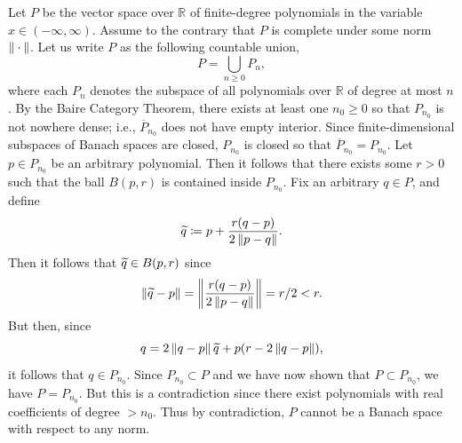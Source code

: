 \documentclass{article}
\begin{document}
	Let $P$ be the vector space over $\mathbb{R}$ of finite-degree polynomials in the variable $x\in (-\infty, \infty)$. Assume to the contrary that $P$ is complete under some norm $\left\Vert \hspace{2pt}\cdot\hspace{2pt} \right\Vert$. Let us write $P$ as the following countable union, 
	\begin{equation*}
		P = \bigcup_{n \geq 0} P_{n}, 
	\end{equation*}
	where each $P_n$ denotes the subspace of all polynomials over $\mathbb{R}$ of degree at most $n$. By the Baire Category Theorem, there exists at least one $n_{0} \geq 0$ so that $P_{n_{0}}$ is not nowhere dense; i.e., $\overline{P}_{n_{0}}$ does not have empty interior. Since finite-dimensional subspaces of Banach spaces are closed, $P_{n_{0}}$ is closed so that $\overline{P}_{n_{0}} = P_{n_{0}}$. Let $p\in P_{n_{0}}$ be an arbitrary polynomial. Then it follows that there exists some $r > 0$ such that the ball $B(p,r)$ is contained inside $P_{n_{0}}$. Fix an arbitrary $q \in P$, and define 
	\begin{equation*}
		\widetilde{q} \coloneqq p + \frac{r(q - p)}{2\left\Vert p - q \right\Vert}. 
	\end{equation*}
	Then it follows that $\widetilde{q} \in B(p,r)$ since 
	\begin{equation*}
		\left\Vert \widetilde{q} -p \right\Vert = \left\Vert \frac{r(q - p)}{2\left\Vert p - q \right\Vert} \right\Vert = r/2 < r. 
	\end{equation*}
	But then, since 
	\begin{equation*}
		q = 2\left\Vert q - p \right\Vert\widetilde{q} + p(r - 2\left\Vert q - p \right\Vert), 
	\end{equation*}
	it follows that $q \in P_{n_{0}}$. Since $P_{n_{0}} \subset P$ and we have now shown that $P \subset P_{n_{0}}$, we have $P = P_{n_{0}}$. But this is a contradiction since there exist polynomials with real coefficients of degree $> n_{0}$. Thus by contradiction, $P$ cannot be a Banach space with respect to any norm. 
	
\end{document}
